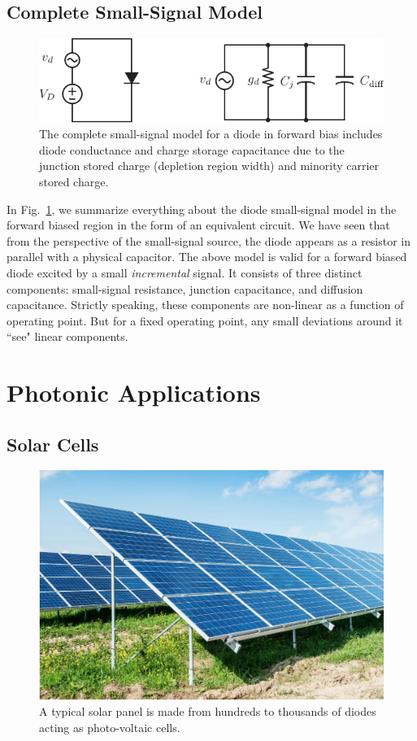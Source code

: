 \subsection{Complete Small-Signal Model}

\begin{figure}[tb]
\begin{center}
\includegraphics[width=.75\columnwidth]{diode_ss_model}
\end{center}
\caption{The complete small-signal model for a diode in forward bias includes diode conductance and charge storage capacitance due to the junction stored charge (depletion region width) and minority carrier stored charge. } \label{fig:diode_ss_model}
\end{figure}

In Fig.~\ref{fig:diode_ss_model}, we summarize everything about the diode small-signal model in the forward biased region in the form of an equivalent circuit.  We have seen that  from the perspective of the small-signal source, the diode appears as a resistor in parallel with a physical capacitor.    The above model is valid for a forward biased diode excited by a small \emph{incremental} signal.   It consists of three distinct components:  small-signal resistance, junction capacitance, and diffusion capacitance.  Strictly speaking, these components are non-linear as a function of operating point.  But for a fixed operating point, any small deviations around it ``see" linear components.
 


\section{Photonic Applications}





\subsection{Solar Cells}

\begin{figure}[tb]
\begin{center}
\includegraphics[width=.5\columnwidth]{solar_cell.jpg}
\end{center}
\caption{A typical solar panel is made from hundreds to thousands of diodes acting as photo-voltaic cells. } \label{fig:solar_cell}
\end{figure}

